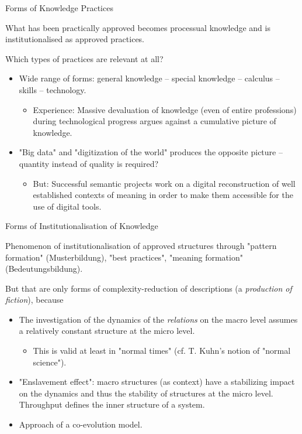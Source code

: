 \documentclass{beamer}
\begin{document}
\begin{frame}{Forms of Knowledge Practices}
  
What has been practically approved becomes processual knowledge and is
institutionalised as approved practices.

Which types of practices are relevant at all?
\begin{itemize}
\item Wide range of forms: general knowledge -- special knowledge -- calculus
  -- skills -- technology.
  \begin{itemize}
  \item Experience: Massive devaluation of knowledge (even of entire
    professions) during technological progress argues against a cumulative
    picture of knowledge.
  \end{itemize}
\item "Big data" and "digitization of the world" produces the opposite picture
  -- quantity instead of quality is required?
  \begin{itemize}
  \item But: Successful semantic projects work on a digital reconstruction of
    well established contexts of meaning in order to make them accessible for
    the use of digital tools.
  \end{itemize}
\end{itemize}
\end{frame}
\begin{frame}{Forms of Institutionalisation of Knowledge}
  
Phenomenon of institutionalisation of approved structures through "pattern
formation" (Musterbildung), "best practices", "meaning formation"
(Bedeutungsbildung).

But that are only forms of complexity-reduction of descriptions (a
\emph{production of fiction}), because\vspace{-1em}
\begin{itemize}
\item The investigation of the dynamics of the \emph{relations} on the macro
  level assumes a relatively constant structure at the micro level.
  \begin{itemize}
  \item This is valid at least in "normal times" (cf. T. Kuhn's notion of 
    "normal science").
  \end{itemize}
\item "Enslavement effect": macro structures (as context) have a stabilizing
  impact on the dynamics and thus the stability of structures at the micro
  level.  Throughput defines the inner structure of a system.  
\item Approach of a co-evolution model.
\end{itemize}
\end{frame}
\end{document}
